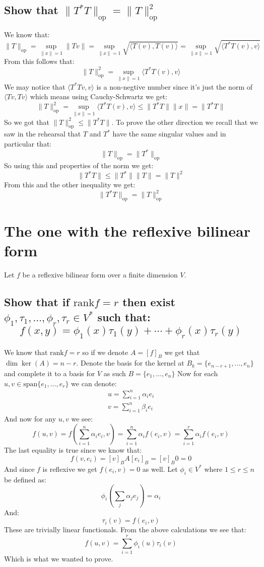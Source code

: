 \documentclass[11pt,a4paper]{article}
\theoremstyle{plain}
\newcommand{\op}{\mathrm{op}}
\newcommand{\ip}[2]{\langle #1, #2 \rangle}
\begin{document}
	\subsection{Show that $\|T^*T\|_{\text{op}} =  \|T\|_{\text{op}}^{2}$}
	We know that:
	\[
		\|T\|_{\mathrm{op}} = \sup_{\|x\|=1}{\|Tv\|} 
					= \sup_{\|x\|=1}{\sqrt{\ip{T(v)}{T(v)}}}
					= \sup_{\|x\|=1}{\sqrt{\ip{T^*T(v)}{v}}}
	\]
	From this follows that:
	\[
		\|T\|_{\op}^{2} = \sup_{\|x\|=1}{\ip{T^*T(v)}{v}}
	\]
	We may notice that $\ip{T^\ast Tv}{v}$ is a non-negtive number since it's
	just the norm of $\ip{Tv}{Tv}$ which means using Cauchy-Schwartz we get:
	\[
		\|T\|_{\op}^{2} = \sup_{\|x\|=1}{\ip{T^*T(v)}{v}} \le 
		\|T^\ast T\| \|x\| = \|T^\ast T\|
	\]
	So we got that $\|T\|_{\op}^{2} \le \|T^\ast T\|$. To prove the other
	direction we recall that we saw in the rehearsal that $T$ and $T^\ast$
	have the same singular values and in particular that:
	\[
		\|T\|_{\op} = \|T^\ast\|_{\op}
	\]
	So using this and properties of the norm we get:
	\[
		\|T^\ast T\| \le \|T^\ast\| \|T\| = \|T\|^2
	\]
	From this and the other inequality we get:
	\[
		\boxed{\|T^*T\|_{\text{op}} =  \|T\|_{\text{op}}^{2}}
	\]
	
	\newpage
	
	\section{The one with the reflexive bilinear form}
	Let $f$ be a reflexive bilinear form over a finite dimension $V$.
	\subsection{Show that if $\mathrm{rank}f=r$ then exist 
	$\phi_1,\tau_1,\dots,\phi_r,\tau_r\in V^*$ such that:
	\[
		f(x,y) = 
		\phi_{1}(x)\tau_{1}(y) + \cdots + \phi_{r}(x)\tau_{r}(y)
	\]}
 	We know that $\mathrm{rank} f = r$ so if we denote $A = [f]_B$ 
 	we get that $\dim\ker(A) = n - r$. Denote the basis for the
 	kernel at $B_k = \{e_{n-r+1}, \dots, e_n\}$ and complete it
 	to a basis for $V$ as such $B = \{e_{1}, \dots, e_n\}$ 
 	Now for each $u,v\in\mathrm{span}\{e_{1}, \dots, e_r\}$ we can 
 	denote:
	\begin{align*}
		u = \sum_{i=1}^{n}{\alpha_i e_i} \\
		v = \sum_{i=1}^{n}{\beta_i e_i}
	\end{align*}
	And now for any $u,v$ we see:
	\[
		f(u,v) = f\left(\sum_{i=1}^{n}{\alpha_i e_i}, v\right) = 
		\sum_{i=1}^{n}{\alpha_i f(e_i,v)} = 
		\sum_{i=1}^{r}{\alpha_i f(e_i,v)}
	\]
	The last equality is true since we know that:
	\[
		f(v,e_i) = [v]_B A [e_i]_B = [v]_B 0 = 0
	\]
	And since $f$ is reflexive we get $f(e_i,v) = 0$ as well.
	Let $\phi_i\in V^*$ where $1 \le r \le n$ be defined as:
	\[
		\phi_i\left(\sum_{j}{\alpha_j e_j}\right) = \alpha_i
	\]
	And:
	\[
		\tau_i(v) = f(e_i,v)
	\]
	These are trivially linear functionals. From the above calculations we see that:
	\[
		f(u,v) = \sum_{i=1}^{r}{\phi_i(u)\tau_i(v)}
	\]
	Which is what we wanted to prove.
	
\end{document}
